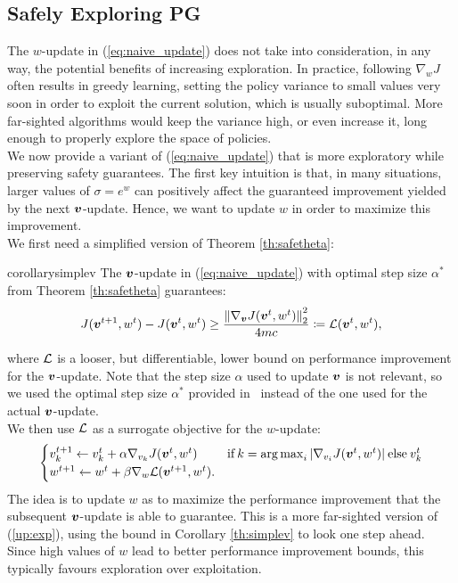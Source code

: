 \subsection{Safely Exploring PG}\label{sec:explore+safe}
The $w$-update in (\ref{eq:naive_update}) does not take into consideration, in any way, the potential benefits of increasing exploration. In practice, following $\nabla_{w}J$ often results in greedy learning, setting the policy variance to small values very soon in order to exploit the current solution, which is usually suboptimal. More far-sighted algorithms would keep the variance high, or even increase it, long enough to properly explore the space of policies. \\
We now provide a variant of (\ref{eq:naive_update}) that is more exploratory while preserving safety guarantees. The first key intuition is that, in many situations, larger values of $\sigma=e^w$ can positively affect the guaranteed improvement yielded by the next $\vv$-update. Hence, we want to update $w$ in order to maximize this improvement. \\
We first need a simplified version of Theorem \ref{th:safetheta}:
\begin{restatable}[]{corollary}{simplev}\label{th:simplev}
	The $\vv$-update in (\ref{eq:naive_update}) with optimal step size $\alpha^*$ from Theorem \ref{th:safetheta} guarantees:
	\begin{align*}
	J(\vv^{t+1},w^t) - J(\vv^t,w^t) \geq \frac{\norm[2]{\gradJ[\vv]{\vv^t,w^t}}^2}{4mc}
	\coloneqq \Deltav(\vv^t,w^t),
	\end{align*}
\end{restatable}
where $\Deltav$ is a looser, but differentiable, lower bound on performance improvement for the $\vv$-update. Note that the step size $\alpha$ used to update $\vv$ is not relevant, so we used the optimal step size $\alpha^*$ provided in~\cite{adaptive_batch} instead of the one used for the actual $\vv$-update. \\
We then use $\Deltav$ as a surrogate objective for the $w$-update:
%
\begin{align}\label{up:exp}
\begin{cases}
v_{k}^{t+1} \gets v_{k}^t + \alpha\gradJ[v_{k}]{\vv^t,w^t}
& \text{if}\:k =  \argmax_i |\gradJ[v_i]{\vv^t, w^t}| \:\text{else}\:v_{k}^t\\
w^{t+1} \gets w^t + \beta\gradDelta(\vv^{t+1}, w^t).
\end{cases}
\end{align}
%
The idea is to update $w$ as to maximize the performance improvement that the subsequent $\vv$-update is able to guarantee. This is a more far-sighted version of (\ref{up:exp}), using the bound in Corollary \ref{th:simplev} to look one step ahead. Since high values of $w$ lead to better performance improvement bounds, this typically favours exploration over exploitation.\\
